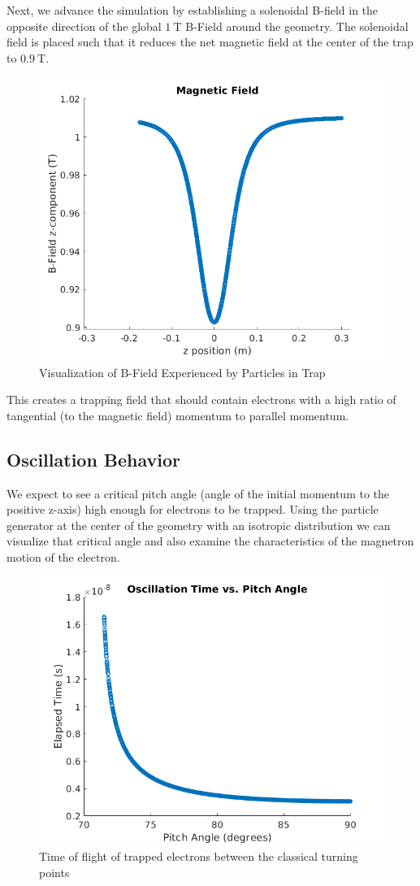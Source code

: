 \documentclass[12pt,letterpaper]{article}
\begin{document}
Next, we advance the simulation by establishing a solenoidal B-field in the opposite direction of the global $1~$T B-Field around the geometry. The solenoidal field is placed such that it reduces the net magnetic field at the center of the trap to $0.9~$T. 

    \begin{figure}[H]
    \centering
    \includegraphics[width=0.7\linewidth]{img/solenoid.png}
    \caption{Visualization of B-Field Experienced by Particles in Trap}
    \end{figure}

This creates a trapping field that should contain electrons with a high ratio of tangential (to the magnetic field) momentum to parallel momentum.

\subsection{Oscillation Behavior}

We expect to see a critical pitch angle (angle of the initial momentum to the positive z-axis) high enough for electrons to be trapped. Using the particle generator at the center of the geometry with an isotropic distribution we can visualize that critical angle and also examine the characteristics of the magnetron motion of the electron. 

    \begin{figure}[H]
    \centering
    \includegraphics[width=0.7\linewidth]{img/oscillationtime.png}
    \caption{Time of flight of trapped electrons between the classical turning points}
    \end{figure}
    
\end{document}
